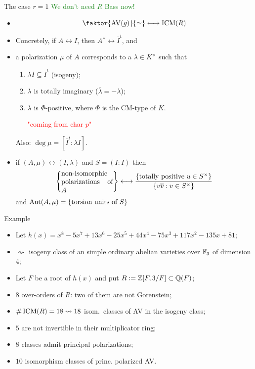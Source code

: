 \documentclass[usenames,dvipsnames]{beamer}
\DeclareMathOperator{\AV}{AV}
\newcommand{\green}[1]{\textcolor{ForestGreen}{#1}}
\begin{document}
\begin{frame}{ The case $r=1$ }
\pause \green{We don't need $R$ Bass now! }
\pause 
\begin{itemize}
 \item \[ \faktor{\AV(g)}{\simeq} \longleftrightarrow \ICM(R) \]
\pause \item Concretely, if $A\leftrightarrow I$, then $A^\vee \leftrightarrow \overline{I}^t$, and
\pause \item a polarization $\mu$ of $A$ corresponds to a $\lambda\in K^\times$ such that
      \begin{enumerate}[-]
\pause \item $\lambda I \subseteq \overline{I}^t$ (isogeny);
\pause \item $\lambda$ is totally imaginary ($\overline \lambda = -\lambda$);
\pause \item $\lambda$ is $\Phi$-positive, where $\Phi$ is the CM-type of $K$. \textcolor{red}{\parbox{6em}{\center "coming from char $p$"}}
      \end{enumerate} 
\pause Also: $\deg \mu= [\overline{I}^t : \lambda I]$.
\pause  \item if $(A,\mu) \leftrightarrow (I,\lambda)$ and $S=(I:I)$ then
  \[\set{\parbox[p]{7.5em}{non-isomorphic polarizations of $A$}} \longleftrightarrow \dfrac{\set{\text{totally positive }u\in S^\times }}{\set{v\overline{v}: v\in S^\times}}\]
  and $\operatorname{Aut}(A,\mu) = \left\lbrace\text{torsion units of $S$}\right\rbrace$
\end{itemize}

\end{frame}

\begin{frame}{ Example}
\begin{itemize}
 \item Let $h(x)=x^8 - 5x^7 + 13x^6 - 25x^5 + 44x^4 - 75x^3 + 117x^2 - 135x + 81$;
 \item $\rightsquigarrow$ isogeny class of an simple ordinary abelian varieties over $\mathbb{F}_{3}$ of dimension $4$;
 \item Let $F$ be a root of $h(x)$ and put $R:=\mathbb{Z}[F,3/F]\subset \mathbb{Q}(F)$;
 \item $8$ over-orders of $R$: two of them are not Gorenstein;
 \item $\#\operatorname{ICM}(R) = 18 \rightsquigarrow 18$ isom.~classes of AV in the isogeny class;
 \item $5$ are not invertible in their multiplicator ring;
 \item $8$ classes admit principal polarizations;
 \item $10$ isomorphism classes of princ. polarized AV.
\end{itemize}
\end{frame}
\end{document}
